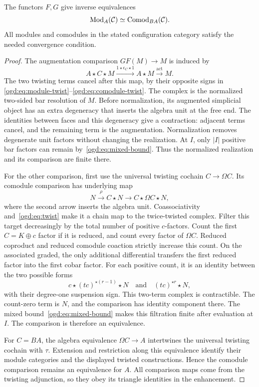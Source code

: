 \begin{theorem}\label{ogd:thm:modules}
The functors \(F,G\) give inverse equivalences
\[
 \operatorname{Mod}_A(\mathcal C)\simeq\operatorname{Comod}_{BA}(\mathcal C).
\]
All modules and comodules in the stated configuration category satisfy the needed convergence condition.
\end{theorem}
\begin{proof}
The augmentation comparison \(GF(M)\to M\) is induced by
\[
 A\star C\star M\xrightarrow{1\star\epsilon_C\star1}
 A\star M\xrightarrow{\operatorname{act}}M.
\]
The two twisting terms cancel after this map, by their opposite signs in
\eqref{ogd:eq:module-twist}--\eqref{ogd:eq:comodule-twist}.
The complex is the normalized two-sided bar resolution of \(M\).
Before normalization, its augmented simplicial object has an extra degeneracy that inserts the algebra unit at the free end.
The identities between faces and this degeneracy give a contraction: adjacent terms cancel, and the remaining term is the augmentation.
Normalization removes degenerate unit factors without changing the realization.
At \(I\), only \(|I|\) positive bar factors can remain by~\eqref{ogd:eq:mixed-bound}.
Thus the normalized realization and its comparison are finite there.

For the other comparison, first use the universal twisting cochain
\(C\to\Omega C\).
Its comodule comparison has underlying map
\[
 N\xrightarrow\rho C\star N\longrightarrow C\star\Omega C\star N,
\]
where the second arrow inserts the algebra unit.
Coassociativity and~\eqref{ogd:eq:twist} make it a chain map to the twice-twisted complex.
Filter this target decreasingly by the total number of positive \(c\)-factors.
Count the first \(C=K\oplus c\) factor if it is reduced, and count every factor of \(\Omega C\).
Reduced coproduct and reduced comodule coaction strictly increase this count.
On the associated graded, the only additional differential transfers the first reduced factor into the first cobar factor.
For each positive count, it is an identity between the two possible forms
\[
 c\star(tc)^{\star(r-1)}\star N
 \quad\text{and}\quad
 (tc)^{\star r}\star N,
\]
with their degree-one suspension sign.
This two-term complex is contractible.
The count-zero term is \(N\), and the comparison has identity component there.
The mixed bound~\eqref{ogd:eq:mixed-bound} makes this filtration finite after evaluation at \(I\).
The comparison is therefore an equivalence.

For \(C=BA\), the algebra equivalence \(\Omega C\to A\) intertwines the universal twisting cochain with \(\tau\).
Extension and restriction along this equivalence identify their module categories and the displayed twisted constructions.
Hence the comodule comparison remains an equivalence for \(A\).
All comparison maps come from the twisting adjunction, so they obey its triangle identities in the enhancement.
\end{proof}


